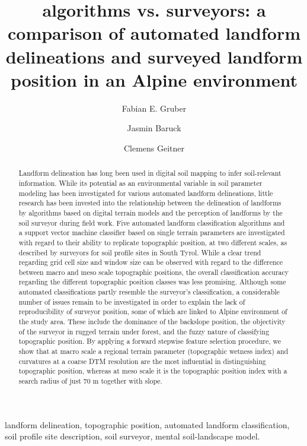 \documentclass[preprint,12pt,authoryear]{elsarticle}
\begin{document}
\begin{frontmatter}

\title{algorithms vs. surveyors: a comparison of automated landform delineations and surveyed landform position in an Alpine environment}


\author{Fabian E. Gruber}
\author{Jasmin Baruck}
\author{Clemens Geitner}

\address{University of Innsbruck}

\begin{abstract}
Landform delineation has long been used in digital soil mapping to infer soil-relevant information. While its potential as an environmental variable in soil parameter modeling has been investigated for various automated landform delineations, little research has been invested into the relationship between the delineation of landforms by algorithms based on digital terrain models and the perception of landforms by the soil surveyor during field work. Five automated landform classification algorithms and a support vector machine classifier based on single terrain parameters are investigated  with regard to their ability to replicate topographic position, at two different scales, as described by surveyors for soil profile sites in South Tyrol. While a clear trend regarding grid cell size and window size can be observed with regard to the difference between macro and meso scale topographic positions, the overall classification accuracy regarding the different topographic position classes was less promising. Although some automated classifications partly resemble the surveyor's classification, a considerable number of issues remain to be investigated in order to explain the lack of reproducibility of surveyor position, some of which are linked to Alpine environment of the study area.  These include the dominance of the backslope position, the objectivity of the surveyor in rugged terrain under forest, and the fuzzy nature of classifying topographic position. By applying a forward stepwise feature selection procedure, we show that at macro scale a regional terrain parameter (topographic wetness index) and curvatures at a coarse DTM resolution are the most influential in distinguishing topographic position, whereas at meso scale it is the topographic position index with a search radius of just 70 m together with slope.  
 
\end{abstract}

\begin{keyword}
landform delineation, topographic position, automated landform classification, soil profile site description, soil surveyor, mental soil-landscape model.
\end{keyword}

\end{frontmatter}
\end{document}
